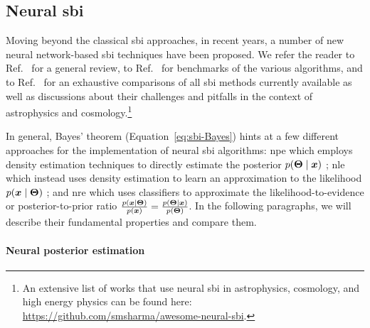 \subsection{Neural \gls*{sbi}} \label{subsec:nsbi}

Moving beyond the classical \gls*{sbi} approaches, in recent years, a number of new neural network-based \gls*{sbi} techniques have been proposed. We refer the reader to Ref.~\cite{Cranmer:2019eaq} for a general review, to Ref.~\cite{Lueckmann:2021aa} for benchmarks of the various algorithms, and to Ref.~\cite{Ho:2024whi} for an exhaustive comparisons of all \gls*{sbi} methods currently available as well as discussions about their challenges and pitfalls in the context of astrophysics and cosmology.\footnote{An extensive list of works that use neural \gls*{sbi} in astrophysics, cosmology, and high energy physics can be found here: \url{https://github.com/smsharma/awesome-neural-sbi}.} 

In general, Bayes' theorem (Equation~\eqref{eq:sbi-Bayes}) hints at a few different approaches for the implementation of neural \gls*{sbi} algorithms: \gls*{npe} which employs density estimation techniques to directly estimate the posterior $p(\bm{\Theta}\mid\bm{x})$ \cite{Papamakarios:2016ctj, Greenberg:2019aa}; \gls*{nle} which instead uses density estimation to learn an approximation to the likelihood $p(\bm{x}\mid\bm{\Theta})$ \cite{Papamakarios:2018aa, Durkan:2018aa}; and \gls*{nre} \cite{cranmer2015approximating, gutmann2018likelihood, Hermans:2019ioj, thomas2022likelihood, Miller:2020hua} which uses classifiers to approximate the likelihood-to-evidence or posterior-to-prior ratio $\frac{p(\bm{x}\mid\bm{\Theta})}{p(\bm{x})}=\frac{p(\bm{\Theta}\mid\bm{x})}{p(\bm{\Theta})}$. In the following paragraphs, we will describe their fundamental properties and compare them.


\paragraph*{Neural posterior estimation}

